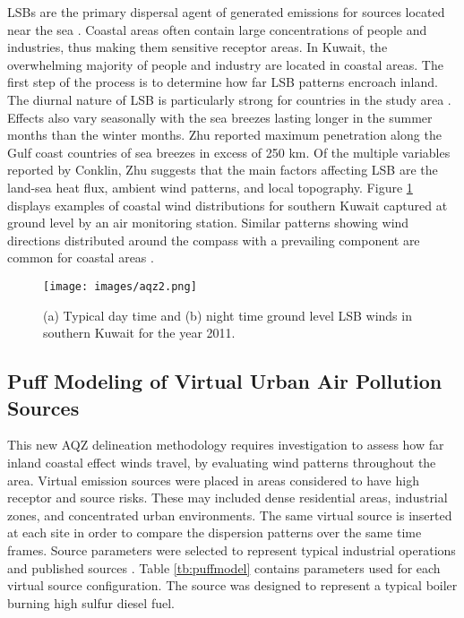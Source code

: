 LSBs are the primary dispersal agent of generated emissions for sources located near the sea \citep{Cuxart2014}.  Coastal areas often contain large concentrations of people and industries, thus making them sensitive receptor areas.  In Kuwait, the overwhelming majority of people and industry are located in coastal areas.  The first step of the process is to determine how far LSB patterns encroach inland.  The diurnal nature of LSB is particularly strong for countries in the study area \citep{Zhu2004}.  Effects also vary seasonally with the sea breezes lasting longer in the summer months than the winter months.  Zhu reported maximum penetration along the Gulf coast countries of sea breezes in excess of 250 km.  Of the multiple variables reported by Conklin, Zhu suggests that the main factors affecting LSB are the land-sea heat flux, ambient wind patterns, and local topography.  Figure \ref{fig:LSBwinds} displays examples of coastal wind distributions for southern Kuwait captured at ground level by an air monitoring station.  Similar patterns showing wind directions distributed around the compass with a prevailing component are common for coastal areas \citep{Lozano2013}.

%
\begin{figure}
\texttt{[image: images/aqz2.png]} 
\caption[Typical LSB winds for Kuwait]{(a) Typical day time and (b) night time ground level LSB winds in southern Kuwait for the year 2011.}
\label{fig:LSBwinds}
\end{figure}
% 
\subsection{Puff Modeling of Virtual Urban Air Pollution Sources}

This new AQZ delineation methodology requires investigation to assess how far inland coastal effect winds travel, by evaluating wind patterns throughout the area.  Virtual emission sources were placed in areas considered to have high receptor and source risks.  These may included dense residential areas, industrial zones, and concentrated urban environments.  The same virtual source is inserted at each site in order to compare the dispersion patterns over the same time frames. Source parameters were selected to represent typical industrial operations and published sources \citep{Chusai2012}. Table \ref{tb:puffmodel} contains parameters used for each virtual source configuration.  The source was designed to represent a typical boiler burning high sulfur diesel fuel.

